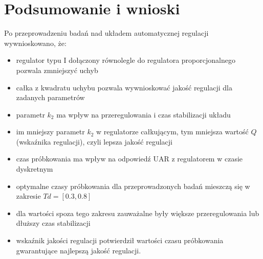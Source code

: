 \documentclass[12pt]{article}
\begin{document}
\section{Podsumowanie i wnioski}
Po przeprowadzeniu badań nad układem automatycznej regulacji wywnioskowano, że:
\begin{itemize}
    \item regulator typu I dołączony równolegle do regulatora proporcjonalnego pozwala zmniejszyć uchyb
    \item całka z kwadratu uchybu pozwala wywnioskować jakość regulacji dla zadanych parametrów
    \item parametr $k_2$ ma wpływ na przeregulowania i czas stabilizacji układu
    \item im mniejszy parametr $k_2$ w regulatorze całkującym, tym mniejsza wartość $Q$ (wskaźnika regulacji), czyli lepsza jakość regulacji
    \item czas próbkowania ma wpływ na odpowiedź UAR z regulatorem w czasie dyskretnym
    \item optymalne czasy próbkowania dla przeprowadzonych badań mieszczą się w zakresie $Td = [0.3, 0.8]$
    \item dla wartości spoza tego zakresu zauważalne były większe przeregulowania lub dłuższy czas stabilizacji
    \item wskaźnik jakości regulacji potwierdził wartości czasu próbkowania gwarantujące najlepszą jakość regulacji.
\end{itemize}
\end{document}
